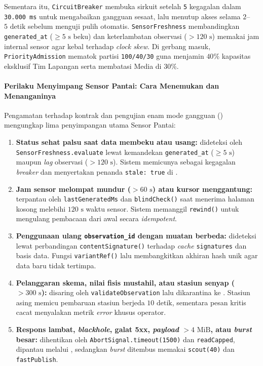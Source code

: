 Sementara itu, \texttt{CircuitBreaker} membuka sirkuit setelah \texttt{5} kegagalan dalam \texttt{30.000 ms} untuk mengabaikan gangguan sesaat, lalu menutup akses selama $2$--$5\text{ detik}$ sebelum menguji pulih otomatis. \texttt{SensorFreshness} membandingkan \texttt{generated\_at} ($\ge 5\text{ s}$ beku) dan keterlambatan observasi ($> 120\text{ s}$) memakai jam internal sensor agar kebal terhadap \textit{clock skew}. Di gerbang masuk, \texttt{PriorityAdmission} mematok partisi \texttt{100/40/30} guna menjamin $40\%$ kapasitas eksklusif Tim Lapangan serta membatasi Media di $30\%$.

\paragraph*{Perilaku Menyimpang Sensor Pantai: Cara Menemukan dan Menanganinya}
Pengamatan terhadap kontrak dan pengujian enam mode gangguan () mengungkap lima penyimpangan utama Sensor Pantai:

\begin{enumerate}
  \item \textbf{Status  sehat palsu saat data membeku atau usang:} dideteksi oleh \texttt{SensorFreshness.evaluate} lewat kemandekan \texttt{generated\_at} ($\ge 5\text{ s}$) maupun \textit{lag} observasi ($> 120\text{ s}$). Sistem memicunya sebagai kegagalan \textit{breaker} dan menyertakan penanda \texttt{stale: true} di .
  \item \textbf{Jam sensor melompat mundur ($> 60\text{ s}$) atau kursor menggantung:} terpantau oleh \texttt{lastGeneratedMs} dan \texttt{blindCheck()} saat menerima halaman kosong melebihi $120\text{ s}$ waktu sensor. Sistem memanggil \texttt{rewind()} untuk mengulang pembacaan dari awal secara \textit{idempotent}.
  \item \textbf{Penggunaan ulang \texttt{observation\_id} dengan muatan berbeda:} dideteksi lewat perbandingan \texttt{contentSignature()} terhadap \textit{cache} \texttt{signatures} dan basis data. Fungsi \texttt{variantRef()} lalu membangkitkan akhiran hash unik agar data baru tidak tertimpa.
  \item \textbf{Pelanggaran skema, nilai fisis mustahil, atau stasiun senyap ($> 300\text{ s}$):} disaring oleh \texttt{validateObservation} lalu dikarantina ke . Stasiun asing memicu pembaruan stasiun berjeda $10\text{ detik}$, sementara pesan kritis cacat menyalakan metrik \textit{error} khusus operator.
  \item \textbf{Respons lambat, \textit{blackhole}, galat 5xx, \textit{payload} $> 4\text{ MiB}$, atau \textit{burst} besar:} dihentikan oleh \texttt{AbortSignal.timeout(1500)} dan \texttt{readCapped}, dipantau melalui , sedangkan \textit{burst} ditembus memakai \texttt{scout(40)} dan \texttt{fastPublish}.
\end{enumerate}

